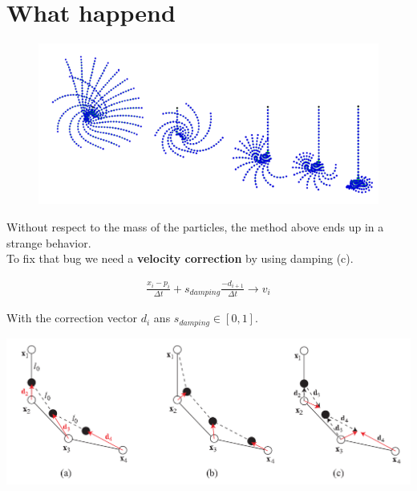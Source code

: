 \documentclass[
paper=192mm:144mm, %
fontsize=12pt, %
pagesize, %
parskip=half-, %
]{scrartcl} %
\theoremstyle{mythmstyle} %
\begin{document}
\clearpage


\section{\color{white}What happend}

\begin{figure}
	\vspace{-1cm}
    \includegraphics[scale=0.6]{Bilder/3.png}
\end{figure}

Without respect to the mass of the particles, the method above ends up in a strange behavior.\\
To fix that bug we need a \textbf{velocity correction} by using damping (c).

\vspace{-1cm}
\begin{eqnarray}
\frac{x_i - p_i}{\Delta t} + s_{damping}\frac{-d_{i+1}}{\Delta t} \rightarrow v_i
\end{eqnarray}

With the correction vector $d_i$ ans $s_{damping} \in [0,1]$.

\begin{center}
\begin{framed}
\includegraphics[scale=0.45]{Bilder/2.png}
\end{framed}
\end{center}
\end{document}
